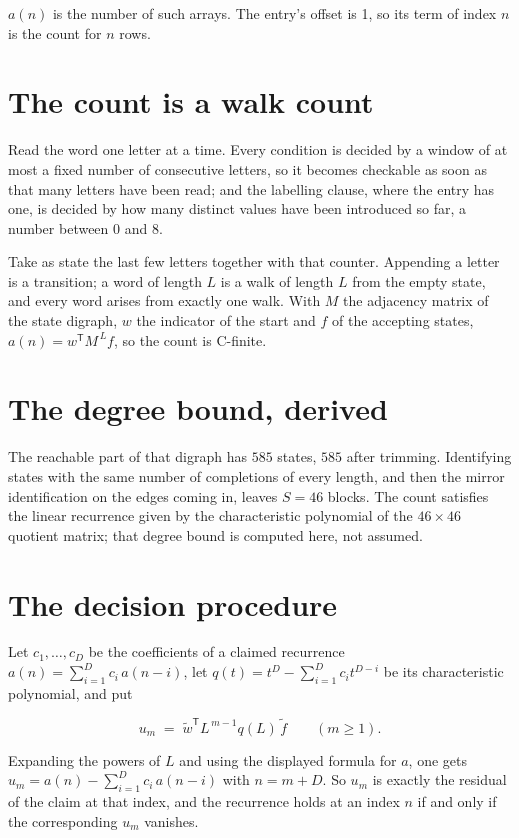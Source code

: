 \documentclass[11pt]{article}
\theoremstyle{definition}
\begin{document}
$a(n)$ is the number of such arrays. The entry's offset is 1, so its term of index $n$ is the count for $n$ rows.

\section{The count is a walk count}

Read the word one letter at a time. Every condition is decided by a window of at most a fixed number of consecutive letters, so it becomes checkable as soon as that many letters have been read; and the labelling clause, where the entry has one, is decided by how many distinct values have been introduced so far, a number between $0$ and 8.

Take as state the last few letters together with that counter. Appending a letter is a transition; a word of length $L$ is a walk of length $L$ from the empty state, and every word arises from exactly one walk. With $M$ the adjacency matrix of the state digraph, $w$ the indicator of the start and $f$ of the accepting states, $a(n) = w^{\mathsf T}M^{\,L}f$, so the count is C-finite.

\section{The degree bound, derived}

The reachable part of that digraph has $585$ states, $585$ after trimming. Identifying states with the same number of completions of every length, and then the mirror identification on the edges coming in, leaves $S = 46$ blocks. The count satisfies the linear recurrence given by the characteristic polynomial of the $46\times46$ quotient matrix; that degree bound is computed here, not assumed.

\section{The decision procedure}

Let $c_1,\dots,c_D$ be the coefficients of a claimed recurrence $a(n) = \sum_{i=1}^{D} c_i\,a(n-i)$, let $q(t) = t^{D} - \sum_{i=1}^{D} c_i t^{D-i}$ be its characteristic polynomial, and put

\[u_m \;=\; \tilde w^{\mathsf T} L^{\,m-1} q(L)\,\tilde f \qquad (m \ge 1).\]

Expanding the powers of $L$ and using the displayed formula for $a$, one gets $u_m = a(n) - \sum_{i=1}^{D} c_i\,a(n-i)$ with $n = m + D$. So $u_m$ is exactly the residual of the claim at that index, and the recurrence holds at an index $n$ if and only if the corresponding $u_m$ vanishes.
\end{document}
